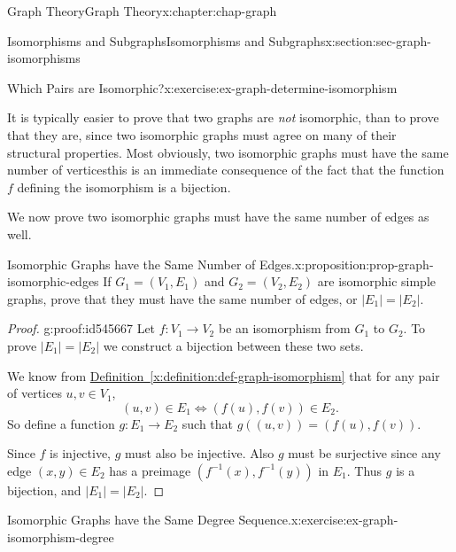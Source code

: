 \documentclass[oneside,10pt,]{book}
\newcommand{\xreffont}{\relax}
\numberwithin{equation}{section}
\begin{document}
\begin{chapterptx}{Graph Theory}{}{Graph Theory}{}{}{x:chapter:chap-graph}
\begin{sectionptx}{Isomorphisms and Subgraphs}{}{Isomorphisms and Subgraphs}{}{}{x:section:sec-graph-isomorphisms}
\begin{inlineexercise}{Which Pairs are Isomorphic?}{x:exercise:ex-graph-determine-isomorphism}
\begin{sidebyside}{2}{0.0425}{0.0425}{0.085}
\begin{sbspanel}{0.23}
{
}%
\end{sbspanel}%
\end{sidebyside}%
\end{inlineexercise}%
It is typically easier to prove that two graphs are \emph{not} isomorphic, than to prove that they are, since two isomorphic graphs must agree on many of their structural properties. Most obviously, two isomorphic graphs must have the same number of vertices\textemdash{}this is an immediate consequence of the fact that the function \(f\) defining the isomorphism is a bijection.%
\par
We now prove two isomorphic graphs must have the same number of edges as well.%
\begin{proposition}{Isomorphic Graphs have the Same Number of Edges.}{}{x:proposition:prop-graph-isomorphic-edges}%
If \(G_1 = (V_1,E_1)\) and \(G_2 = (V_2,E_2)\) are isomorphic simple graphs, prove that they must have the same number of edges, or \(|E_1| = |E_2|\).%
\end{proposition}
\begin{proof}{}{g:proof:id545667}
Let \(f: V_1 \rightarrow V_2\) be an isomorphism from \(G_1\) to \(G_2\). To prove \(|E_1| = |E_2|\) we construct a bijection between these two sets.%
\par
We know from \hyperref[x:definition:def-graph-isomorphism]{Definition~{\xreffont\ref{x:definition:def-graph-isomorphism}}} that for any pair of vertices \(u,v \in V_1\),%
\begin{equation*}
(u,v) \in E_1 \Leftrightarrow (f(u),f(v)) \in E_2\text{.}
\end{equation*}
So define a function \(g: E_1 \rightarrow E_2\) such that \(g\left( (u,v) \right) = \left( f(u),f(v)\right)\).%
\par
Since \(f\) is injective, \(g\) must also be injective. Also \(g\) must be surjective since any edge \((x,y) \in E_2\) has a preimage \((f^{-1}(x),f^{-1}(y))\) in \(E_1\). Thus \(g\) is a bijection, and \(|E_1| = |E_2|\).%
\end{proof}
\begin{inlineexercise}{Isomorphic Graphs have the Same Degree Sequence.}{x:exercise:ex-graph-isomorphism-degree}%

\end{inlineexercise}
\end{sectionptx}
\end{chapterptx}
\end{document}
